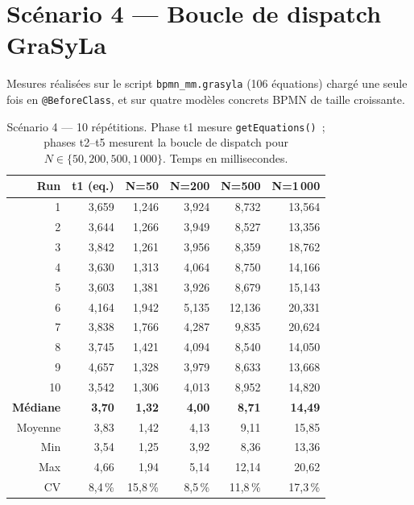 \section{Scénario 4 — Boucle de dispatch GraSyLa}
\label{ann:mesures-s4}

Mesures réalisées sur le script \texttt{bpmn\_mm.grasyla} (106 équations)
chargé une seule fois en \texttt{@BeforeClass}, et sur quatre modèles
concrets BPMN de taille croissante.

\begin{table}[h]
\centering
\caption{Scénario 4 — 10 répétitions. Phase t1 mesure
\texttt{getEquations()}~; phases t2--t5 mesurent la boucle de dispatch
pour $N \in \{50, 200, 500, 1\,000\}$. Temps en millisecondes.}
\begin{tabular}{rrrrrr}
\hline
\textbf{Run} & \textbf{t1 (eq.)} & \textbf{N=50} & \textbf{N=200} &
\textbf{N=500} & \textbf{N=1\,000} \\
\hline
1  & 3,659 & 1,246 & 3,924 &  8,732 & 13,564 \\
2  & 3,644 & 1,266 & 3,949 &  8,527 & 13,356 \\
3  & 3,842 & 1,261 & 3,956 &  8,359 & 18,762 \\
4  & 3,630 & 1,313 & 4,064 &  8,750 & 14,166 \\
5  & 3,603 & 1,381 & 3,926 &  8,679 & 15,143 \\
6  & 4,164 & 1,942 & 5,135 & 12,136 & 20,331 \\
7  & 3,838 & 1,766 & 4,287 &  9,835 & 20,624 \\
8  & 3,745 & 1,421 & 4,094 &  8,540 & 14,050 \\
9  & 4,657 & 1,328 & 3,979 &  8,633 & 13,668 \\
10 & 3,542 & 1,306 & 4,013 &  8,952 & 14,820 \\
\hline
\textbf{Médiane} & \textbf{3,70} & \textbf{1,32} & \textbf{4,00} & \textbf{8,71} & \textbf{14,49} \\
Moyenne          & 3,83          & 1,42          & 4,13          & 9,11          & 15,85 \\
Min              & 3,54          & 1,25          & 3,92          & 8,36          & 13,36 \\
Max              & 4,66          & 1,94          & 5,14          & 12,14         & 20,62 \\
CV               & 8,4\,\%       & 15,8\,\%      & 8,5\,\%       & 11,8\,\%      & 17,3\,\% \\
\hline
\end{tabular}
\end{table}


